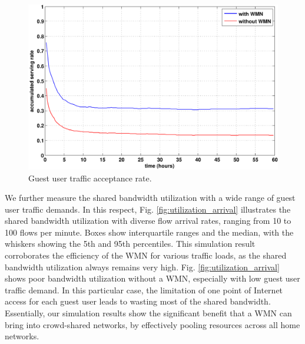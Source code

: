 \begin{figure}[t]
\begin{center}
\includegraphics[width=1\linewidth]{results/acceptance_rate.pdf}
\caption{Guest user traffic acceptance rate.}
\label{fig:acceptance}
\end{center}
\end{figure}

We further measure the shared bandwidth utilization with a wide range of guest user traffic demands. In this respect, Fig. \ref{fig:utilization_arrival} illustrates the shared bandwidth utilization with diverse flow arrival rates, ranging from 10 to 100 flows per minute. Boxes show interquartile
ranges and the median, with the whiskers showing the 5th and 95th percentiles. This simulation result corroborates the efficiency of the WMN for various traffic loads, as the shared bandwidth utilization always remains very high. Fig. \ref{fig:utilization_arrival} shows poor bandwidth utilization without a WMN, especially with low guest user traffic demand. In this particular case, the limitation of one point of Internet access for each guest user leads to wasting most of the shared bandwidth. Essentially, our simulation results show the significant benefit that a WMN can bring into crowd-shared networks, by effectively pooling resources across all home networks.

